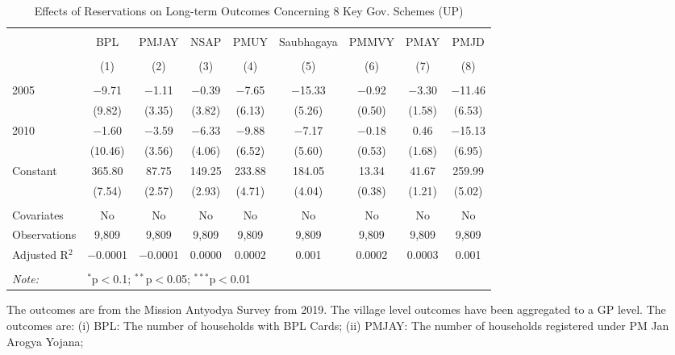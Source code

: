 \begin{table}[!htbp]
\centering
\begin{threeparttable}

  \caption{Effects of Reservations on Long-term Outcomes Concerning 8 Key Gov. Schemes (UP)} 
  \label{up_shrug_schemes_05_10} 
\scriptsize 
\begin{tabular}{@{\extracolsep{0pt}}lcccccccc} 
\\[-1.8ex]\hline 
\hline \\[-1.8ex] 
 & BPL & PMJAY & NSAP & PMUY & Saubhagaya & PMMVY & PMAY & PMJD \\ 
\\[-1.8ex] & (1) & (2) & (3) & (4) & (5) & (6) & (7) & (8)\\ 
\hline \\[-1.8ex] 
 2005 & $-$9.71 & $-$1.11 & $-$0.39 & $-$7.65 & $-$15.33 & $-$0.92 & $-$3.30 & $-$11.46 \\ 
  & (9.82) & (3.35) & (3.82) & (6.13) & (5.26) & (0.50) & (1.58) & (6.53) \\ 
  2010 & $-$1.60 & $-$3.59 & $-$6.33 & $-$9.88 & $-$7.17 & $-$0.18 & 0.46 & $-$15.13 \\ 
  & (10.46) & (3.56) & (4.06) & (6.52) & (5.60) & (0.53) & (1.68) & (6.95) \\ 
  Constant & 365.80 & 87.75 & 149.25 & 233.88 & 184.05 & 13.34 & 41.67 & 259.99 \\ 
  & (7.54) & (2.57) & (2.93) & (4.71) & (4.04) & (0.38) & (1.21) & (5.02) \\ 
 \hline \\[-1.8ex] 
Covariates & No & No & No & No & No & No & No & No \\ 
Observations & 9,809 & 9,809 & 9,809 & 9,809 & 9,809 & 9,809 & 9,809 & 9,809 \\ 
Adjusted R$^{2}$ & $-$0.0001 & $-$0.0001 & 0.0000 & 0.0002 & 0.001 & 0.0002 & 0.0003 & 0.001 \\ 
\hline 
\hline \\[-1.8ex] 
\textit{Note:}  & \multicolumn{8}{l}{$^{*}$p$<$0.1; $^{**}$p$<$0.05; $^{***}$p$<$0.01} \\ 
\end{tabular} 
\begin{tablenotes}[flushleft]
\scriptsize
\item The outcomes are from the Mission Antyodya Survey from 2019. 
                   The village level outcomes have been aggregated to a GP level. The outcomes are:
                   (i) BPL: The number of households with BPL Cards;
                   (ii) PMJAY: The number of households registered under PM Jan Arogya Yojana;

\end{tablenotes}
\end{threeparttable}
\end{table}
